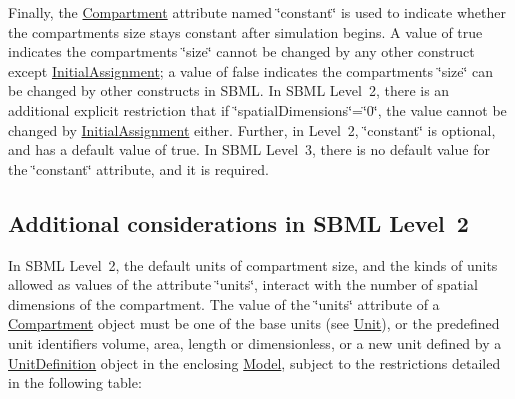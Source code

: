 Finally, the \hyperlink{class_compartment}{Compartment} attribute named \char`\"{}constant\char`\"{} is used to indicate whether the compartment\textquotesingle{}s size stays constant after simulation begins. A value of {\ttfamily true} indicates the compartment\textquotesingle{}s \char`\"{}size\char`\"{} cannot be changed by any other construct except \hyperlink{class_initial_assignment}{Initial\+Assignment}; a value of {\ttfamily false} indicates the compartment\textquotesingle{}s \char`\"{}size\char`\"{} can be changed by other constructs in S\+B\+ML. In S\+B\+ML Level~2, there is an additional explicit restriction that if \char`\"{}spatial\+Dimensions\char`\"{}={\ttfamily \char`\"{}0\char`\"{}}, the value cannot be changed by \hyperlink{class_initial_assignment}{Initial\+Assignment} either. Further, in Level~2, \char`\"{}constant\char`\"{} is optional, and has a default value of {\ttfamily true}. In S\+B\+ML Level~3, there is no default value for the \char`\"{}constant\char`\"{} attribute, and it is required.\hypertarget{class_compartment_comp-l2}{}\subsection{Additional considerations in S\+B\+M\+L Level 2}\label{class_compartment_comp-l2}
In S\+B\+ML Level~2, the default units of compartment size, and the kinds of units allowed as values of the attribute \char`\"{}units\char`\"{}, interact with the number of spatial dimensions of the compartment. The value of the \char`\"{}units\char`\"{} attribute of a \hyperlink{class_compartment}{Compartment} object must be one of the base units (see \hyperlink{class_unit}{Unit}), or the predefined unit identifiers {\ttfamily volume}, {\ttfamily area}, {\ttfamily length} or {\ttfamily dimensionless}, or a new unit defined by a \hyperlink{class_unit_definition}{Unit\+Definition} object in the enclosing \hyperlink{class_model}{Model}, subject to the restrictions detailed in the following table\+:


